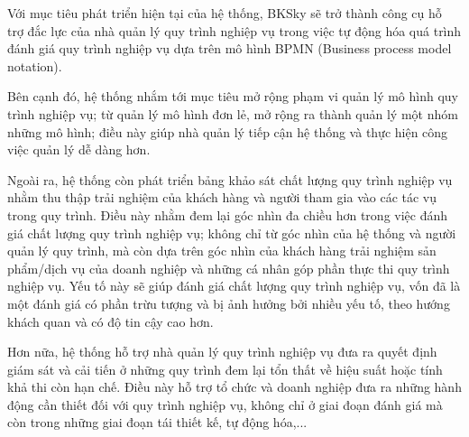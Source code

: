 
Với mục tiêu phát triển hiện tại của hệ thống, BKSky sẽ trở thành công cụ hỗ trợ đắc lực của nhà quản lý quy trình nghiệp vụ trong việc tự động hóa quá trình đánh giá quy trình nghiệp vụ dựa trên mô hình BPMN (Business process model notation).

Bên cạnh đó, hệ thống nhắm tới mục tiêu mở rộng phạm vi quản lý mô hình quy trình nghiệp vụ; từ quản lý mô hình đơn lẻ, mở rộng ra thành quản lý một nhóm những mô hình; điều này giúp nhà quản lý tiếp cận hệ thống và thực hiện công việc quản lý dễ dàng hơn.

Ngoài ra, hệ thống còn phát triển bảng khảo sát chất lượng quy trình nghiệp vụ nhằm thu thập trải nghiệm của khách hàng và người tham gia vào các tác vụ trong quy trình. Điều này nhằm đem lại góc nhìn đa chiều hơn trong việc đánh giá chất lượng quy trình nghiệp vụ; không chỉ từ góc nhìn của hệ thống và người quản lý quy trình, mà còn dựa trên góc nhìn của khách hàng trải nghiệm sản phẩm/dịch vụ của doanh nghiệp và những cá nhân góp phần thực thi quy trình nghiệp vụ. Yếu tố này sẽ giúp đánh giá chất lượng quy trình nghiệp vụ, vốn đã là một đánh giá có phần trừu tượng và bị ảnh hưởng bởi nhiều yếu tố, theo hướng khách quan và có độ tin cậy cao hơn.

Hơn nữa, hệ thống hỗ trợ nhà quản lý quy trình nghiệp vụ đưa ra quyết định giám sát và cải tiến ở những quy trình đem lại tổn thất về hiệu suất hoặc tính khả thi còn hạn chế. Điều này hỗ trợ tổ chức và doanh nghiệp đưa ra những hành động cần thiết đối với quy trình nghiệp vụ, không chỉ ở giai đoạn đánh giá mà còn trong những giai đoạn tái thiết kế, tự động hóa,...